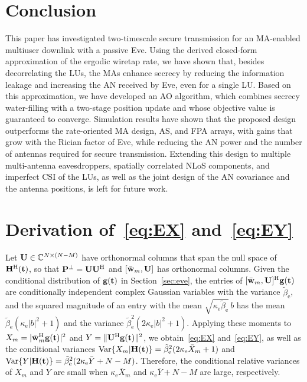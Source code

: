 \documentclass[journal]{IEEEtran}
\newcommand{\rev}[1]{{\color{red}#1}}
\newcommand{\rev}[1]{#1}
\begin{document}
\section{Conclusion}\label{sec:conclusion}
This paper has investigated two-timescale secure transmission for an MA-enabled multiuser downlink with a passive Eve. Using the derived closed-form approximation of the ergodic wiretap rate, we have shown that, besides decorrelating the LUs, the MAs enhance secrecy by reducing the information leakage and increasing the AN received by Eve, even for a single LU. Based on this approximation, we have developed an AO algorithm, which combines secrecy water-filling with a two-stage position update and whose objective value is guaranteed to converge. Simulation results have shown that the proposed design outperforms the rate-oriented MA design, AS, and FPA arrays\rev{, with gains that grow with the Rician factor of Eve,} while reducing the AN power and the number of antennas required for secure transmission. Extending this design to multiple multi-antenna eavesdroppers, spatially correlated NLoS components, and imperfect CSI of the LUs\rev{, as well as the joint design of the AN covariance and the antenna positions,} is left for future work.

\appendices
\section{Derivation of~\eqref{eq:EX} and~\eqref{eq:EY}}\label{app:indep}
Let $\mathbf{U}\in\mathbb C^{N\times(N-M)}$ have orthonormal columns that span the null space of $\mathbf{H}^{\mathrm H}(\mathbf{t})$, so that $\mathbf{P}^{\perp}=\mathbf{U}\mathbf{U}^{\mathrm H}$ and $[\bar{\mathbf{w}}_m,\mathbf{U}]$ has orthonormal columns. Given the conditional distribution of $\mathbf{g}(\mathbf{t})$ in Section~\ref{sec:eve}, the entries of $[\bar{\mathbf{w}}_m,\mathbf{U}]^{\mathrm H}\mathbf{g}(\mathbf{t})$ are conditionally independent complex Gaussian variables with the variance $\tilde\beta_{\mathrm e}$, and the squared magnitude of an entry with the mean $\sqrt{\kappa_{\mathrm e}\tilde\beta_{\mathrm e}}\,b$ has the mean $\tilde\beta_{\mathrm e}(\kappa_{\mathrm e}|b|^2+1)$ and the variance $\tilde\beta_{\mathrm e}^2(2\kappa_{\mathrm e}|b|^2+1)$. Applying these moments to $X_m=|\bar{\mathbf{w}}_m^{\mathrm H}\mathbf{g}(\mathbf{t})|^2$ and $Y=\|\mathbf{U}^{\mathrm H}\mathbf{g}(\mathbf{t})\|^2$, we obtain~\eqref{eq:EX} and~\eqref{eq:EY}, as well as the conditional variances $\mathrm{Var}\{X_m|\mathbf{H}(\mathbf{t})\}=\tilde\beta_{\mathrm e}^2(2\kappa_{\mathrm e}\bar X_m+1)$ and $\mathrm{Var}\{Y|\mathbf{H}(\mathbf{t})\}=\tilde\beta_{\mathrm e}^2(2\kappa_{\mathrm e}\bar Y+N-M)$. Therefore, the conditional relative variances of $X_m$ and $Y$ are small when $\kappa_{\mathrm e}\bar X_m$ and $\kappa_{\mathrm e}\bar Y+N-M$ are large, respectively.
\end{document}

